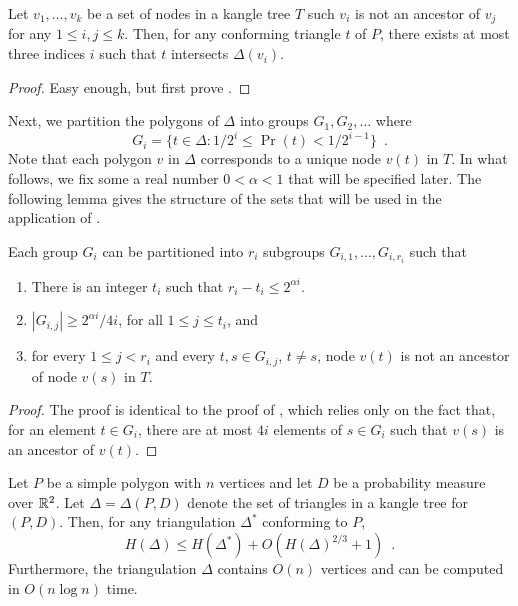 \documentclass[charterfonts,lotsofwhite]{patmorin}
\begin{document}
\begin{lem}
Let $v_1,\ldots,v_k$ be a set of nodes in a kangle tree $T$ such
$v_i$ is not an ancestor of $v_j$ for any $1\le i,j\le k$.  Then, for
any conforming triangle $t$ of $P$, there exists at most three indices
$i$ such that $t$ intersects $\Delta(v_i)$.
\end{lem}

\begin{proof}
Easy enough, but first prove .
\end{proof}

Next, we partition the polygons of $\Delta$ into groups
$G_1,G_2,\ldots$ where
\[
	G_i = \{t\in \Delta : 1/2^{i} \le \Pr(t) < 1/2^{i-1} \} \enspace .
\]
Note that each polygon $v$ in $\Delta$ corresponds to a unique node
$v(t)$ in $T$.
In what follows, we fix some a real number $0< \alpha < 1$ that will be
specified later.   The following lemma gives the structure of the sets
that will be used in the application of .

\begin{lem}
Each group $G_i$ can be partitioned into $r_i$ subgroups
$G_{i,1},\ldots,G_{i,r_i}$ such that
\begin{enumerate}
\item There is an integer $t_i$ such that $r_i-t_i\le 2^{\alpha i}$.

\item $|G_{i,j}| \ge 2^{\alpha i} / 4i$, for all $1\le j \le t_i$, and

\item for every $1\le j< r_i$ and every $t,s\in G_{i,j}$, $t\neq s$, 
node $v(t)$ is not an ancestor of node $v(s)$ in $T$. 
\end{enumerate}
\end{lem}

\begin{proof}
The proof is identical to the proof of , which
relies only on the fact that, for an element $t\in G_i$, there are at
most $4i$ elements of $s\in G_i$ such that $v(s)$ is an ancestor of
$v(t)$.
\end{proof}

\begin{lem}
Let $P$ be a simple polygon with $n$ vertices and let $D$ be a
probability measure over $\mathbb{R}^2$.  Let $\Delta=\Delta(P,D)$ denote the
set of triangles in a kangle tree for $(P,D)$.  Then, for any
triangulation $\Delta^*$ conforming to $P$,
\[
    H(\Delta) \le H(\Delta^*) + O(H(\Delta)^{2/3}+1) \enspace .
\]
Furthermore, the triangulation $\Delta$ contains $O(n)$ vertices and
can be computed in $O(n\log n)$ time.
\end{lem}
\end{document}
